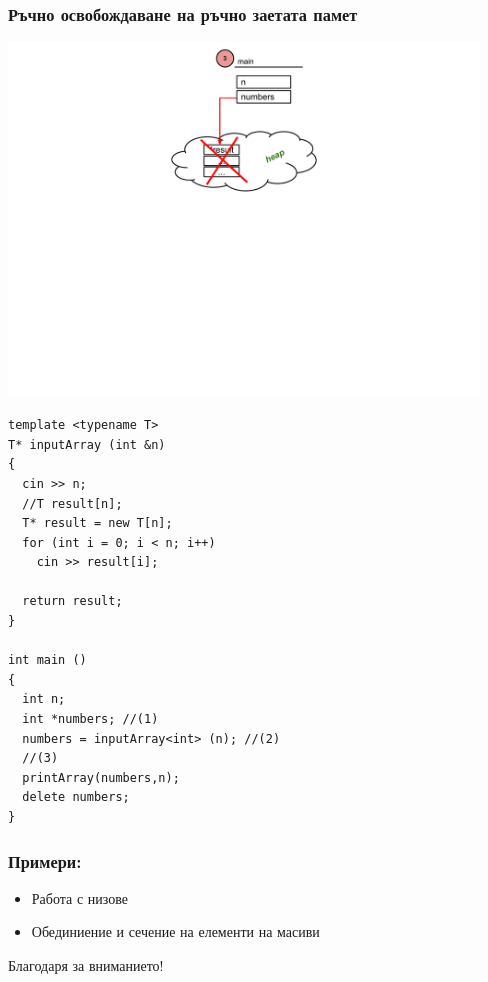 \documentclass{beamer}
\begin{document}
\begin{frame}[fragile]
\frametitle{Ръчно освобождаване на ръчно заетата памет}


\includegraphics[width=12.5cm]{images/delete}

\vspace{-230px}
\begin{flushleft}
\begin{lstlisting}
template <typename T>
T* inputArray (int &n)
{ 
  cin >> n;
  //T result[n];
  T* result = new T[n];
  for (int i = 0; i < n; i++)
    cin >> result[i];

  return result;
}

int main ()
{
  int n;
  int *numbers; //(1)
  numbers = inputArray<int> (n); //(2)
  //(3) 
  printArray(numbers,n);
  delete numbers;
} 

\end{lstlisting}  
\end{flushleft}

\end{frame}




\begin{frame}[fragile]
\frametitle{Примери:}

\begin{itemize}
  \item Работа с низове
  \item Обединиение и сечение на елементи на масиви
\end{itemize}


\end{frame}


\begin{frame}
\centerline{Благодаря за вниманието!}
\end{frame}
\end{document}
